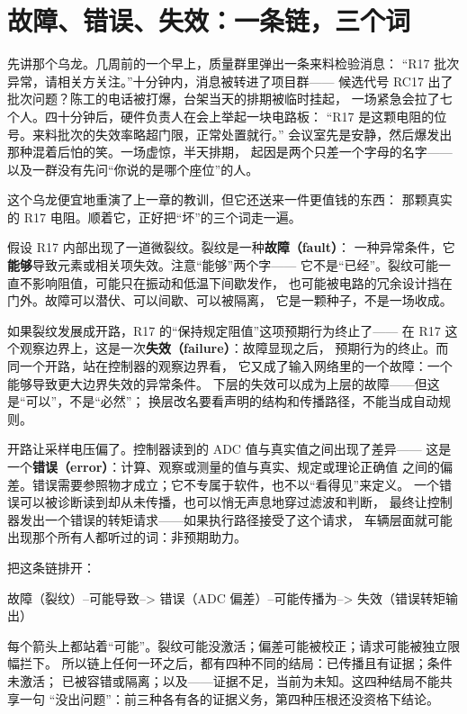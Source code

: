\section{故障、错误、失效：一条链，三个词}

先讲那个乌龙。几周前的一个早上，质量群里弹出一条来料检验消息：
“R17 批次异常，请相关方关注。”十分钟内，消息被转进了项目群——
候选代号 RC17 出了批次问题？陈工的电话被打爆，台架当天的排期被临时挂起，
一场紧急会拉了七个人。四十分钟后，硬件负责人在会上举起一块电路板：
“R17 是这颗电阻的位号。来料批次的失效率略超门限，正常处置就行。”
会议室先是安静，然后爆发出那种混着后怕的笑。一场虚惊，半天排期，
起因是两个只差一个字母的名字——以及一群没有先问“你说的是哪个座位”的人。

这个乌龙便宜地重演了上一章的教训，但它还送来一件更值钱的东西：
那颗真实的 R17 电阻。顺着它，正好把“坏”的三个词走一遍。

假设 R17 内部出现了一道微裂纹。裂纹是一种\textbf{故障（fault）}：
一种异常条件，它\textbf{能够}导致元素或相关项失效。注意“能够”两个字——
它不是“已经”。裂纹可能一直不影响阻值，可能只在振动和低温下间歇发作，
也可能被电路的冗余设计挡在门外。故障可以潜伏、可以间歇、可以被隔离，
它是一颗种子，不是一场收成。

如果裂纹发展成开路，R17 的“保持规定阻值”这项预期行为终止了——
在 R17 这个观察边界上，这是一次\textbf{失效（failure）}：故障显现之后，
预期行为的终止。而同一个开路，站在控制器的观察边界看，
它又成了输入网络里的一个故障：一个能够导致更大边界失效的异常条件。
下层的失效可以成为上层的故障——但这是“可以”，不是“必然”；
换层改名要看声明的结构和传播路径，不能当成自动规则。

开路让采样电压偏了。控制器读到的 ADC 值与真实值之间出现了差异——
这是一个\textbf{错误（error）}：计算、观察或测量的值与真实、规定或理论正确值
之间的偏差。错误需要参照物才成立；它不专属于软件，也不以“看得见”来定义。
一个错误可以被诊断读到却从未传播，也可以悄无声息地穿过滤波和判断，
最终让控制器发出一个错误的转矩请求——如果执行路径接受了这个请求，
车辆层面就可能出现那个所有人都听过的词：非预期助力。

把这条链排开：

\begin{noteblock}
故障（裂纹）--可能导致--> 错误（ADC 偏差）--可能传播为--> 失效（错误转矩输出）
\end{noteblock}

每个箭头上都站着“可能”。裂纹可能没激活；偏差可能被校正；请求可能被独立限幅拦下。
所以链上任何一环之后，都有四种不同的结局：已传播且有证据；条件未激活；
已被容错或隔离；以及——证据不足，当前为未知。这四种结局不能共享一句
“没出问题”：前三种各有各的证据义务，第四种压根还没资格下结论。

